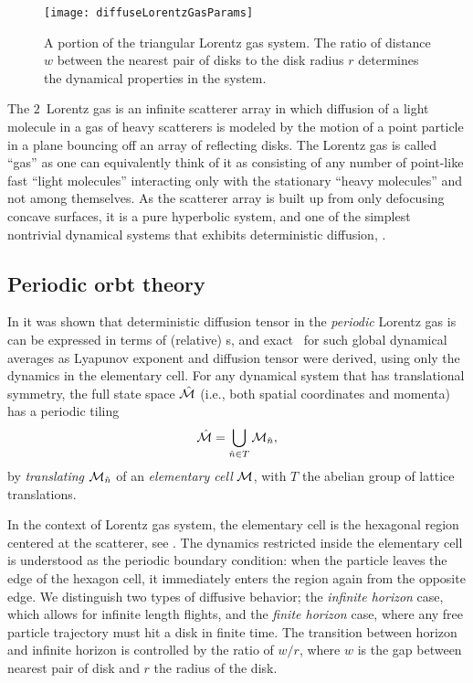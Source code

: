 \documentclass[aps,pre,
                showpacs,
                twocolumn,
                groupedaddress,
                floatfix]{revtex4-1}
\begin{document}
\begin{figure}[htbp]
  \begin{center}

    \texttt{[image: diffuseLorentzGasParams]}

  \end{center}
  \caption[]{\label{fig-schrieberFig1} A portion of the triangular Lorentz gas
  system. The ratio of distance $w$ between the nearest pair of disks to the
  disk radius $r$ determines the dynamical properties in the system.}

\end{figure}

The $2$\dmn\ Lorentz gas is an infinite scatterer array in which diffusion of a
light molecule in a gas of heavy scatterers is modeled by the motion of a point
particle in a plane bouncing off an array of reflecting disks. The Lorentz gas
is called ``gas'' as one can equivalently think of it as consisting of any
number of point-like fast ``light molecules'' interacting only with the
stationary ``heavy molecules'' and not among themselves.  As the scatterer array
is built up from only defocusing concave surfaces, it is a pure hyperbolic
system, and one of the simplest nontrivial dynamical systems that exhibits
deterministic diffusion, .


\subsection{Periodic orbt theory}


In  it was shown that deterministic
diffusion tensor in the {\em periodic} Lorentz gas is can be expressed in terms
of (relative) \po s, and exact \cycForm\ for such global dynamical averages as
Lyapunov exponent and diffusion tensor were derived, using only the dynamics in
the elementary cell. For any dynamical system that has translational symmetry,
the full state space $\hat {{\cal M}}$ (i.e., both spatial coordinates and momenta) has a
periodic tiling \[\hat {{\cal M}}=\bigcup_{ \hat n \in T} {\cal M}_{\hat n},\] by {\em translating}
${\cal M}_{\hat n}$ of an {\em elementary cell} ${\cal M}$, with $T$ the abelian group of
lattice translations.

In the context of Lorentz gas system, the elementary cell is the hexagonal
region centered at the scatterer, see . The dynamics
restricted inside the elementary cell is understood as the periodic boundary
condition: when the particle leaves the edge of the hexagon cell, it immediately
enters the region again from the opposite edge. We distinguish two types of
diffusive behavior; the {\em infinite horizon} case, which allows for infinite
length flights, and the {\em finite horizon} case, where any free particle
trajectory must hit a disk in finite time. The transition between horizon and
infinite horizon is controlled by the ratio of $w/r$, where $w$ is the gap
between nearest pair of disk and $r$ the radius of the disk.
\end{document}
